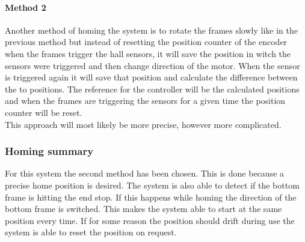 \documentclass[../../../main]{subfiles}
\begin{document}
\paragraph{Method 2}%
\label{par:method_2}
Another method of homing the system is to rotate the frames slowly like in the previous method but instead of resetting the position counter of the encoder when the frames trigger the hall sensors, it will save the position in witch the sensors were triggered and then change direction of the motor.
When the sensor is triggered again it will save that position and calculate the difference between the to positions.
The reference for the controller will be the calculated positions and when the frames are triggering the sensors for a given time the position counter will be reset.
\\
This approach will most likely be more precise, however more complicated.

\subsubsection{Homing summary}%
\label{ssub:homing_summary}
For this system the second method has been chosen. This is done because a precise home position is desired.
The system is also able to detect if the bottom frame is hitting the end stop. If this happens while homing the direction of the bottom frame is switched.
This makes the system able to start at the same position every time.
If for some reason the position should drift during use the system is able to reset the position on request.
\end{document}
